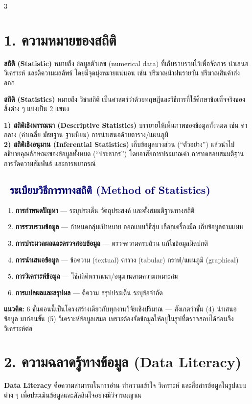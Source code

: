 \documentclass[9pt]{extarticle}
\newcommand{\dist}[1]{\subsection*{\textcolor{navy}{\textbullet\ #1}}}
\begin{document}
\begin{multicols}{3}
\raggedcolumns

\section*{1. ความหมายของสถิติ}
\textbf{สถิติ (Statistic)} หมายถึง ข้อมูลตัวเลข (numerical data) ที่เก็บรวบรวมไว้เพื่อจัดการ นำเสนอ วิเคราะห์ และตีความผลลัพธ์ โดยมีจุดมุ่งหมายแน่นอน เช่น ปริมาณน้ำฝนรายวัน ปริมาณสินค้าส่งออก

\textbf{สถิติ (Statistics)} หมายถึง วิชาสถิติ เป็นศาสตร์ว่าด้วยทฤษฎีและวิธีการที่ใช้ศึกษาข้อเท็จจริงของสิ่งต่าง ๆ แบ่งเป็น 2 แขนง

\begin{formulabox}
\textbf{1) สถิติเชิงพรรณนา (Descriptive Statistics)} บรรยายให้เห็นภาพของข้อมูลทั้งหมด เช่น ค่ากลาง (ค่าเฉลี่ย มัธยฐาน ฐานนิยม) การนำเสนอด้วยตาราง/แผนภูมิ\\[2pt]
\textbf{2) สถิติเชิงอนุมาน (Inferential Statistics)} เก็บข้อมูลบางส่วน (``ตัวอย่าง'') แล้วนำไปอธิบายคุณลักษณะของข้อมูลทั้งหมด (``ประชากร'') โดยอาศัยการประมาณค่า การทดสอบสมมติฐาน การวัดความสัมพันธ์ และการพยากรณ์
\end{formulabox}

\dist{ระเบียบวิธีการทางสถิติ (Method of Statistics)}
\begin{enumerate}
\item \textbf{การกำหนดปัญหา} — ระบุประเด็น วัตถุประสงค์ และตั้งสมมติฐานทางสถิติ
\item \textbf{การรวบรวมข้อมูล} — กำหนดกลุ่มเป้าหมาย ออกแบบวิธีสุ่ม เลือกเครื่องมือ เก็บข้อมูลตามแผน
\item \textbf{การประมวลผลและตรวจสอบข้อมูล} — ตรวจความครบถ้วน แก้ไขข้อมูลผิดปกติ
\item \textbf{การนำเสนอข้อมูล} — ข้อความ (textual) ตาราง (tabular) กราฟ/แผนภูมิ (graphical)
\item \textbf{การวิเคราะห์ข้อมูล} — ใช้สถิติพรรณนา/อนุมานตามความเหมาะสม
\item \textbf{การแปลผลและสรุปผล} — ตีความ สรุปประเด็น ระบุข้อจำกัด
\end{enumerate}
\begin{ideabox}
\textbf{แนวคิด:} 6 ขั้นตอนนี้เป็น\allowbreak โครงสร้างเดียวกับ\allowbreak ทุกงานวิจัยเชิงปริมาณ — สังเกตว่าขั้น (4) นำเสนอข้อมูล มาก่อนขั้น (5) วิเคราะห์ข้อมูลเสมอ เพราะต้อง\allowbreak จัดข้อมูลให้อยู่ในรูปที่ตรวจสอบได้ก่อนจึงวิเคราะห์ต่อ
\end{ideabox}

\section*{2. ความฉลาดรู้ทางข้อมูล (Data Literacy)}
\textbf{Data Literacy} คือความสามารถในการอ่าน ทำความเข้าใจ วิเคราะห์ และสื่อสารข้อมูลในรูปแบบต่าง ๆ เพื่อประเมินข้อมูลและตัดสินใจอย่างมีวิจารณญาณ


\end{multicols}
\end{document}
